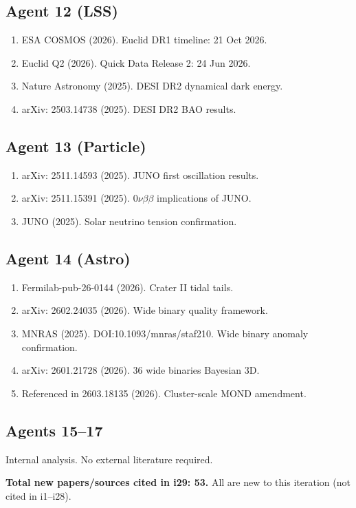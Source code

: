\documentclass[11pt,a4paper]{article}
\begin{document}
\subsection{Agent 12 (LSS)}
\begin{enumerate}
\item ESA COSMOS (2026). Euclid DR1 timeline: 21 Oct 2026.
\item Euclid Q2 (2026). Quick Data Release 2: 24 Jun 2026.
\item Nature Astronomy (2025). DESI DR2 dynamical dark energy.
\item arXiv: 2503.14738 (2025). DESI DR2 BAO results.
\end{enumerate}

\subsection{Agent 13 (Particle)}
\begin{enumerate}
\item arXiv: 2511.14593 (2025). JUNO first oscillation results.
\item arXiv: 2511.15391 (2025). $0\nu\beta\beta$ implications of JUNO.
\item JUNO (2025). Solar neutrino tension confirmation.
\end{enumerate}

\subsection{Agent 14 (Astro)}
\begin{enumerate}
\item Fermilab-pub-26-0144 (2026). Crater II tidal tails.
\item arXiv: 2602.24035 (2026). Wide binary quality framework.
\item MNRAS (2025). DOI:10.1093/mnras/staf210. Wide binary anomaly confirmation.
\item arXiv: 2601.21728 (2026). 36 wide binaries Bayesian 3D.
\item Referenced in 2603.18135 (2026). Cluster-scale MOND amendment.
\end{enumerate}

\subsection{Agents 15--17}
Internal analysis. No external literature required.

\textbf{Total new papers/sources cited in i29: 53.} All are new to this iteration (not cited in i1--i28).
\end{document}
